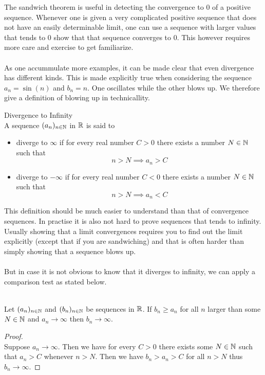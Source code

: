 \documentclass[a4paper]{article}
\begin{document}
The sandwich theorem is useful in detecting the convergence to $0$ of a positive sequence. Whenever one is given a very complicated positive sequence that does not have an easily determinable limit, one can use a sequence with larger values that tends to $0$ show that that sequence converges to $0$. This however requires more care and exercise to get familiarize. \\~\\

As one accummulate more examples, it can be made clear that even divergence has different kinds. This is made explicitly true when considering the sequence $a_n=\sin(n)$ and $b_n=n$. One oscillates while the other blows up. We therefore give a definition of blowing up in technicallity. 

\begin{defn}{Divergence to Infinity}{}\\ A sequence $(a_n)_{n\in\mathbb{N}}$ in $\mathbb{R}$ is said to 
\begin{itemize}
\item diverge to $\infty$ if for every real number $C>0$ there exists a number $N\in\mathbb{N}$ such that $$n>N\implies a_n>C$$
\item diverge to $-\infty$ if for every real number $C<0$ there exists a number $N\in\mathbb{N}$ such that $$n>N\implies a_n<C$$
\end{itemize}
\end{defn}

This definition should be much easier to understand than that of convergence sequences. In practise it is also not hard to prove sequences that tends to infinity. Usually showing that a limit convergences requires you to find out the limit explicitly (except that if you are sandwiching) and that is often harder than simply showing that a sequence blows up. \\~\\
But in case it is not obvious to know that it diverges to infinity, we can apply a comparison test as stated below. 

\begin{prp}{}{}\\ Let $(a_n)_{n\in\mathbb{N}}$ and $(b_n)_{n\in\mathbb{N}}$ be sequences in $\mathbb{R}$. If $b_n\geq a_n$ for all $n$ larger than some $N\in\mathbb{N}$ and $a_n\to\infty$ then $b_n\to\infty$. 
\begin{proof}\\ Suppose $a_n\to\infty$. Then we have for every $C>0$ there exists some $N\in\mathbb{N}$ such that $a_n>C$ whenever $n>N$. Then we have $b_n>a_n>C$ for all $n>N$ thus $b_n\to\infty$. 
\end{proof}
\end{prp}
\end{document}
